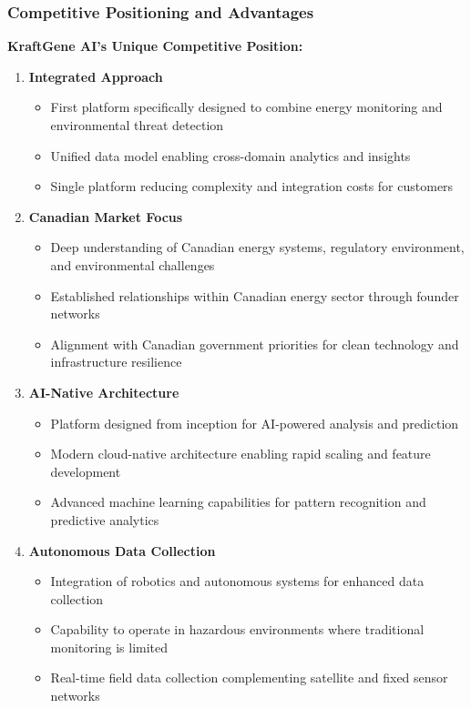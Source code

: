 \subsubsection{Competitive Positioning and Advantages}

\textbf{KraftGene AI's Unique Competitive Position:}

\begin{enumerate}
    \item \textbf{Integrated Approach}
    \begin{itemize}
        \item First platform specifically designed to combine energy monitoring and environmental threat detection
        \item Unified data model enabling cross-domain analytics and insights
        \item Single platform reducing complexity and integration costs for customers
    \end{itemize}
    
    \item \textbf{Canadian Market Focus}
    \begin{itemize}
        \item Deep understanding of Canadian energy systems, regulatory environment, and environmental challenges
        \item Established relationships within Canadian energy sector through founder networks
        \item Alignment with Canadian government priorities for clean technology and infrastructure resilience
    \end{itemize}
    
    \item \textbf{AI-Native Architecture}
    \begin{itemize}
        \item Platform designed from inception for AI-powered analysis and prediction
        \item Modern cloud-native architecture enabling rapid scaling and feature development
        \item Advanced machine learning capabilities for pattern recognition and predictive analytics
    \end{itemize}
    
    \item \textbf{Autonomous Data Collection}
    \begin{itemize}
        \item Integration of robotics and autonomous systems for enhanced data collection
        \item Capability to operate in hazardous environments where traditional monitoring is limited
        \item Real-time field data collection complementing satellite and fixed sensor networks
    \end{itemize}
    

\end{enumerate}
